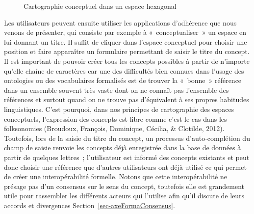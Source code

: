 \documentclass[
  a4paper,
  DIV=11,
  numbers=noendperiod]{scrreprt}
\begin{document}
\begin{figure}


\caption{\label{fig-cartoHexa}Cartographie conceptuel dans un espace
hexagonal}

\end{figure}%

Les utilisateurs peuvent ensuite utiliser les applications d'adhérence
que nous venons de présenter, qui consiste par exemple à
«~conceptualiser~» un espace en lui donnant un titre. Il suffit de
cliquer dans l'espace conceptuel pour choisir une position et faire
apparaître un formulaire permettant de saisir le titre du concept. Il
est important de pouvoir créer tous les concepts possibles à partir de
n'importe qu'elle chaîne de caractères car une des difficultés bien
connues dans l'usage des ontologies ou des vocabulaires formalisés est
de trouver la «~bonne~» référence dans un ensemble souvent très vaste
dont on ne connaît pas l'ensemble des références et surtout quand on ne
trouve pas d'équivalent à ses propres habitudes linguistiques. C'est
pourquoi, dans nos principes de cartographie des espaces conceptuels,
l'expression des concepts est libre comme c'est le cas dans les
folksonomies (Broudoux, François, Dominique, Cécilia, \& Clotilde,
2012). Toutefois, lors de la saisie du titre du concept, un processus
d'auto-complétion du champ de saisie renvoie les concepts déjà
enregistrée dans la base de données à partir de quelques lettres~;
l'utilisateur est informé des concepts existants et peut donc choisir
une référence que d'autres utilisateurs ont déjà utilisé ce qui permet
de créer une interopérabilité formelle. Notons que cette
interopérabilité ne présage pas d'un consensus sur le sens du concept,
toutefois elle est grandement utile pour rassembler les différents
acteurs qui l'utilise afin qu'il discute de leurs accords et divergences
Section~\ref{sec-axeFormaConsensus}.
\end{document}
